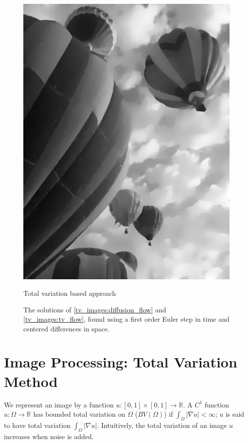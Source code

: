 \begin{figure}
\begin{minipage}[b]{0.47\linewidth}
\includegraphics[width=\textwidth]{tv_denoised_baloons_resized_bw.jpg}
\caption*{Total variation based approach}
\end{minipage}
\caption{The solutions of \eqref{tv_images:diffusion_flow} and \eqref{tv_images:tv_flow}, found using a first order Euler step in time and centered differences in space.}
\label{fig:noise_compare_attempts}
\end{figure}


\section*{Image Processing: Total Variation Method}
We represent an image by a function $u:[0,1]\times[0,1] \to \mathbb{R}$. 
A $C^1$ function $u:\Omega \to \mathbb{R}$ has bounded total variation on $\Omega$ ($BV(\Omega)$) if $\int_{\Omega} |\nabla u| < \infty$; $u$ is said to have total variation $\int_{\Omega} |\nabla u|$.  Intuitively, the total variation of an image $u$ increases when noise is added. 

